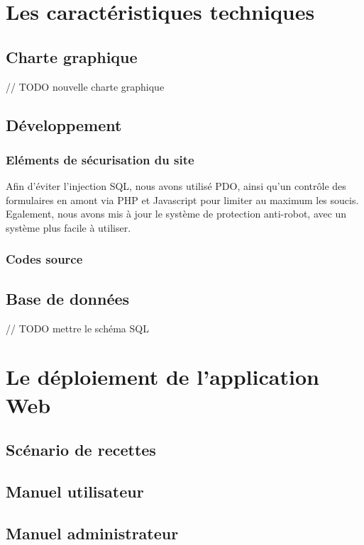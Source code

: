 \documentclass[11pt]{report}
\begin{document}
\chapter{Les caractéristiques techniques}
\section{Charte graphique}
// TODO nouvelle charte graphique
\section{Développement}
\subsection{Eléments de sécurisation du site}
Afin d'éviter l'injection SQL, nous avons utilisé PDO, ainsi qu'un contrôle des
formulaires en amont via PHP et Javascript pour limiter au maximum les soucis.
Egalement, nous avons mis à jour le système de protection anti-robot, avec un
système plus facile à utiliser.
\subsection{Codes source}
\section{Base de données}
// TODO mettre le schéma SQL

\chapter{Le déploiement de l'application Web}
\section{Scénario de recettes}
\section{Manuel utilisateur}
\section{Manuel administrateur}
\end{document}
